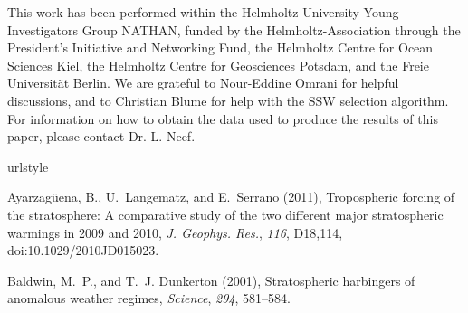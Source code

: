 \documentclass[draft,jgrga]{agutex}
\begin{document}
\begin{article}
\begin{acknowledgments}
This work has been performed within the Helmholtz-University Young Investigators Group NATHAN, funded by the Helmholtz-Association through the President's Initiative and Networking Fund, the Helmholtz Centre for Ocean Sciences Kiel, the Helmholtz Centre for Geosciences Potsdam, and the Freie Universit\"at Berlin.
We are grateful to Nour-Eddine Omrani for helpful discussions, and to Christian Blume for help with the SSW selection algorithm.
For information on how to obtain the data used to produce the results of this paper, please contact Dr. L. Neef.
\end{acknowledgments}

%
%
%
%
%
%
%
%
%

\begin{thebibliography}{38}
\providecommand{\natexlab}[1]{#1}
\expandafter\ifx\csname urlstyle\endcsname\relax
  \providecommand{\doi}[1]{doi:\discretionary{}{}{}#1}\else
  \providecommand{\doi}{doi:\discretionary{}{}{}\begingroup
  \urlstyle{rm}\Url}\fi

Ayarzag{\"u}ena, B., U.~Langematz, and E.~Serrano (2011), Tropospheric forcing
  of the stratosphere: {A} comparative study of the two different major
  stratospheric warmings in 2009 and 2010, \textit{J. Geophys. Res.},
  \textit{116}, D18,114, \doi{10.1029/2010JD015023}.

Baldwin, M.~P., and T.~J. Dunkerton (2001), Stratospheric harbingers of
  anomalous weather regimes, \textit{Science}, \textit{294}, 581--584.


\end{thebibliography}
\end{article}
\end{document}
